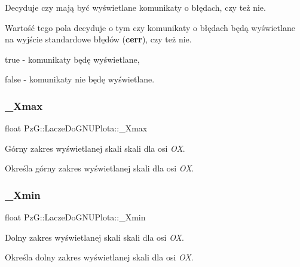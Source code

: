 Decyduje czy mają być wyświetlane komunikaty o błędach, czy też nie. 

Wartość tego pola decyduje o tym czy komunikaty o błędach będą wyświetlane na wyjście standardowe błędów ({\bfseries cerr}), czy też nie. \begin{DoxyItemize}
\item {\ttfamily true} -\/ komunikaty będę wyświetlane, \item {\ttfamily false} -\/ komunikaty nie będę wyświetlane. \end{DoxyItemize}
\mbox{\label{classPzG_1_1LaczeDoGNUPlota_a847e00678a413ab076ccbcb7eba3ae58}} 
\subsubsection{\texorpdfstring{\+\_\+\+Xmax}{\_Xmax}}
{\footnotesize\ttfamily float Pz\+G\+::\+Lacze\+Do\+G\+N\+U\+Plota\+::\+\_\+\+Xmax\hspace{0.3cm}{\ttfamily [protected]}}



Górny zakres wyświetlanej skali skali dla osi {\itshape OX}. 

Określa górny zakres wyświetlanej skali dla osi {\itshape OX}. \mbox{\label{classPzG_1_1LaczeDoGNUPlota_a69d530edfe769e38448972e897456deb}} 
\subsubsection{\texorpdfstring{\+\_\+\+Xmin}{\_Xmin}}
{\footnotesize\ttfamily float Pz\+G\+::\+Lacze\+Do\+G\+N\+U\+Plota\+::\+\_\+\+Xmin\hspace{0.3cm}{\ttfamily [protected]}}



Dolny zakres wyświetlanej skali skali dla osi {\itshape OX}. 

Określa dolny zakres wyświetlanej skali dla osi {\itshape OX}. \mbox{\label{classPzG_1_1LaczeDoGNUPlota_a21e77f0a2bfb7fed989b6dc2d64b5a7e}} 
